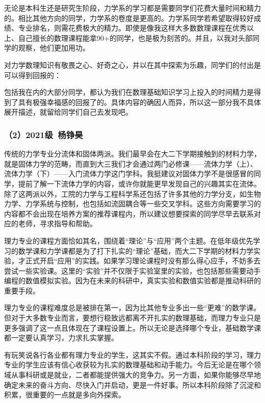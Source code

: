 \documentclass[11pt,oneside]{book}
\begin{document}
无论是本科生还是研究生阶段，力学系的学习都是需要同学们花费大量时间和精力的。相比其他方向的同学，力学系的卷度是更高的。力学系同学若希望取得较好成绩、专业排名，则需花费极大的精力。即使是像我这样大多数数理课程在优秀以上、自己擅长的数理课程能拿90+的同学，也是极为刻苦的。并且，以我对头部同学的观察，他们更加用功。

\vspace{10pt}

对力学数理知识有敬畏之心、好奇之心，并以在其中探索为乐趣，同学们的付出是可以得到回报的：

包括我在内的大部分同学，都认为我们在数理基础知识学习上投入的时间精力是得到了具有极强幸福感的回报了的。具体内容的确因人而异，所以这一部分我不具体展开描述，就留给同学们自己去发现吧。

\subsubsection{（2）2021级\ 杨铮昊}

传统的力学专业分流体和固体两派。我们最早会在大二下学期接触到的材料力学，就是固体力学的范畴，而直到大三我们才会通过两门必修课——流体力学（上）、流体力学（下）——入门流体力学这门学科。我挺建议对固体力学不是很感冒的同学，提前了解一下流体力学的内容，或许你就能更早发现自己的兴趣其实在流体。除了这两派以外，工院的力学与工程科学系还包括了许多其他的力学分支，如生物力学、力学系统与控制，也包括如流固耦合等一些交叉学科。这些方向需要学习的内容都不会出现在培养方案的推荐课程内，所以建议想要探索的同学尽早去联系对应的老师，寻求指导和帮助。

\vspace{10pt}

理力专业的课程方面恰如其名，围绕着“理论”与“应用”两个主题。在低年级优先学习的数学课和力学课都是为了打下扎实的“理论”基础，而大二下学期的材料力学实验，才正式开启“应用”的实践。如果学习理论课程时没有那么得心应手，不妨多去尝试一些实验课。这里的“实验”并不仅限于实验室里的实验，也包括那些需要动手编程的数值模拟实验。因为在未来的科研中，真实实验和数值实验都是推动科研的重要手段。

\vspace{10pt}

理力专业的课程难度总是被排在第一，因为比其他专业多出一些“更难”的数学课。但对于大多数专业而言，要想行稳致远都离不开扎实的数理基础，而理力专业只是更多强调了这一点且体现在了课程设置上。所以无论是选择哪个专业，基础数学课都一定要认真学习，力求扎实掌握。

\vspace{10pt}

有玩笑说各行各业都有理力专业的学生，这其实不假。通过本科阶段的学习，理力专业的学生应该有信心收获较为扎实的数理基础和动手能力。今后无论是在哪个领域从事科研或是就业，二者都能提供强大的竞争力。另一方面，如果你能够尽早地确定未来的奋斗方向、尽快入门并启动，更是一件好事。所以本科阶段除了沉淀和积累，很重要的一点就是多向外探索。
\end{document}
